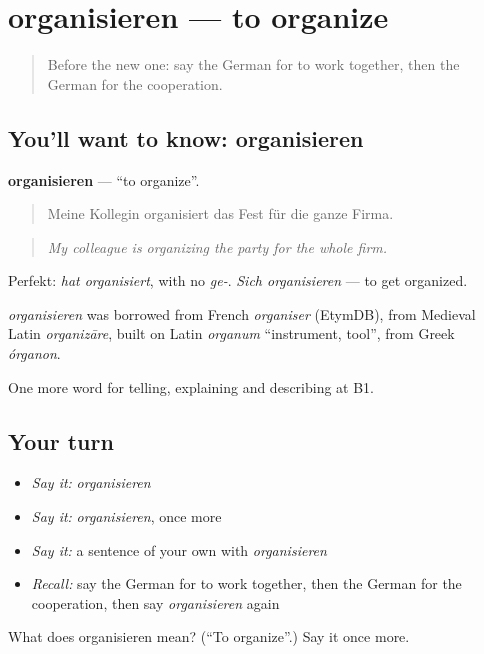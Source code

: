 \section[organisieren]{organisieren — to organize}

\label{lesson:GE-C355-organisieren}



\begin{quote}
Before the new one: say the German for to work together, then the German for the cooperation.
\end{quote}

\subsection*{You'll want to know: organisieren}
\textbf{organisieren} — \textquotedblleft{}to organize\textquotedblright{}.

\begin{quote}
Meine Kollegin organisiert das Fest für die ganze Firma.
\end{quote}

\begin{quote}
\emph{My colleague is organizing the party for the whole firm.}
\end{quote}

Perfekt: \emph{hat organisiert}, with no \emph{ge-}. \emph{Sich organisieren} — to get organized.

\begin{cousinweb}
\emph{organisieren} was borrowed from French \emph{organiser} (EtymDB), from Medieval Latin \emph{organizāre}, built on Latin \emph{organum} \textquotedblleft{}instrument, tool\textquotedblright{}, from Greek \emph{órganon}.
\end{cousinweb}

\begin{grammarlens}[title={What you've built}]
One more word for telling, explaining and describing at B1.
\end{grammarlens}

\subsection*{Your turn}
\begin{itemize}
\raggedright
  \item \emph{Say it:} \emph{organisieren}
  \item \emph{Say it:} \emph{organisieren}, once more
  \item \emph{Say it:} a sentence of your own with \emph{organisieren}
  \item \emph{Recall:} say the German for to work together, then the German for the cooperation, then say \emph{organisieren} again
\end{itemize}

\begin{tcolorbox}[breakable,colback=teal!4,colframe=teal!35!black,title={Before you move on}]
What does organisieren mean? (\textquotedblleft{}To organize\textquotedblright{}.) Say it once more.
\end{tcolorbox}
